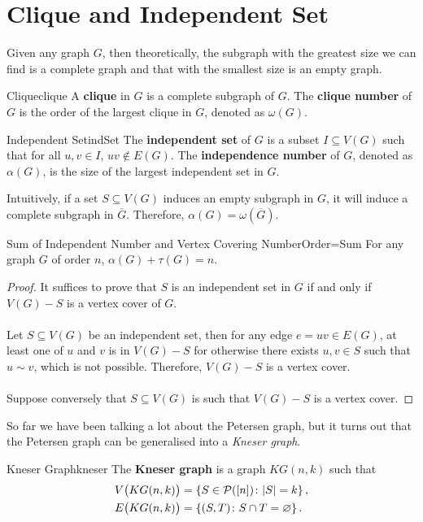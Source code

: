 \documentclass[math, code]{amznotes}
\theoremstyle{remark}
\begin{document}
\section{Clique and Independent Set}
Given any graph $G$, then theoretically, the subgraph with the greatest size we can find is a complete graph and that with the smallest size is an empty graph.
\begin{dfnbox}{Clique}{clique}
    A {\color{red} \textbf{clique}} in $G$ is a complete subgraph of $G$. The {\color{red} \textbf{clique number}} of $G$ is the order of the largest clique in $G$, denoted as $\omega(G)$.
\end{dfnbox}
\begin{dfnbox}{Independent Set}{indSet}
    The {\color{red} \textbf{independent set}} of $G$ is a subset $I \subseteq V(G)$ such that for all $u, v \in I$, $uv \notin E(G)$. The {\color{red} \textbf{independence number}} of $G$, denoted as $\alpha(G)$, is the size of the largest independent set in $G$.
\end{dfnbox}
Intuitively, if a set $S \subseteq V(G)$ induces an empty subgraph in $G$, it will induce a complete subgraph in $\overline{G}$. Therefore, $\alpha(G) = \omega(\overline{G})$.
\begin{probox}{Sum of Independent Number and Vertex Covering Number}{Order=Sum}
    For any graph $G$ of order $n$, $\alpha(G) + \tau(G) = n$.
    \tcblower
    \begin{proof}
        It suffices to prove that $S$ is an independent set in $G$ if and only if $V(G) - S$ is a vertex cover of $G$.
        \\\\
        Let $S \subseteq V(G)$ be an independent set, then for any edge $e = uv \in E(G)$, at least one of $u$ and $v$ is in $V(G) - S$ for otherwise there exists $u, v \in S$ such that $u \sim v$, which is not possible. Therefore, $V(G) - S$ is a vertex cover.
        \\\\
        Suppose conversely that $S \subseteq V(G)$ is such that $V(G) - S$ is a vertex cover.
    \end{proof}
\end{probox}
So far we have been talking a lot about the Petersen graph, but it turns out that the Petersen graph can be generalised into a \textit{Kneser graph}.
\begin{dfnbox}{Kneser Graph}{kneser}
    The {\color{red} \textbf{Kneser graph}} is a graph $KG(n, k)$ such that 
    \begin{align*}
        V\bigl(KG(n, k)\bigr) & = \left\{S \in \mathcal{P}([n]) \colon {\left\lvert {S} \right\rvert} = k\right\}, \\
        E\bigl(KG(n, k)\bigr) & = \left\{(S, T) \colon S \cap T = \varnothing\right\}.
    \end{align*}
\end{dfnbox}
\end{document}
